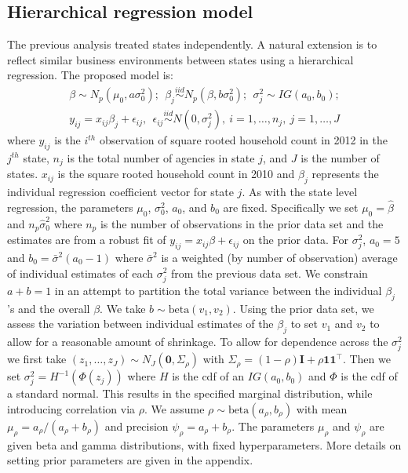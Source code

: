 \documentclass[ba]{imsart}
\newcommand{\mb}{\mathbf}
\newcommand{\iid}{\stackrel{iid}{\sim}}
\begin{document}
\subsection{Hierarchical regression model}
\label{hierRegNW}
The previous analysis treated states independently. A natural extension is to  reflect similar business environments between states using a hierarchical regression. The proposed model is:
\begin{align}
\label{eq:hierModel}
&\beta\sim N_p(\mu_0, a\sigma_0^{2});\ \ 
\beta_j\iid N_p(\beta, b\sigma_0^{2}); \ \  
\sigma_j^2\sim IG(a_0,b_0);  & \\ \nonumber
& y_{ij}=x_{ij}\beta_j+\epsilon_{ij},\ \ \epsilon_{ij}\iid N(0, \sigma_j^2),\ i=1,\dots, n_j,\ j=1,\dots, J &
\end{align}
where $y_{ij}$ is the $i^{th}$ observation of square rooted household count in 2012 in the $j^{th}$
state, $n_{j}$ is the total number of agencies in state $j$, and $J$ is
the number of states. $x_{ij}$ is the square rooted household count in 2010 and $\beta_j$ represents the individual regression coefficient vector for state $j$. As with the state level regression, the parameters $\mu_0$,
$\sigma^{2}_0$, $a_0$, and $b_0$ are fixed. Specifically we set $\mu_{0} = \hat\beta$ and $n_{p}\hat\sigma^{2}_{0}$ where $n_{p}$ is the number of observations in the prior data set and the estimates are from a robust fit of $y_{ij}=x_{ij}\beta+\epsilon_{ij}$ on the prior data. For $\sigma^{2}_{j}$, $a_{0}=5$ and $b_{0} = \bar\sigma^{2}(a_{0} -1)$ where $\bar\sigma^{2}$ is a weighted (by number of observation) average of individual estimates of each $\sigma_{j}^{2}$ from the previous data set. We constrain $a+b=1$
in an attempt to partition the total variance between the individual
$\beta_j$'s and the overall $\beta$. We take $b\sim
\text{beta}(v_1,v_2)$. Using the prior data set, we assess the
variation between individual estimates of the $\beta_j$ to set $v_1$
and $v_2$ to allow for a reasonable amount of shrinkage. To allow for
dependence across the $\sigma_j^2$ we first take
$(z_1,\dots,z_J)\sim N_J(\mathbf{0}, \Sigma_\rho)$ with
$\Sigma_\rho=(1-\rho)\mb{I}+\rho \mb{1}\mb{1}^{\top}$. Then we set
$\sigma^2_j=H^{-1}(\Phi(z_j))$ where $H$ is the cdf of an
$IG(a_0,b_0)$ and $\Phi$ is the cdf of a standard normal. This results in the specified marginal distribution, while
introducing correlation via $\rho$. We assume $\rho\sim
\text{beta}(a_\rho,b_\rho)$ with mean $\mu_\rho=a_\rho/(a_\rho+b_\rho)$ and precision
$\psi_\rho=a_\rho+b_\rho$. The parameters $\mu_\rho$ and
$\psi_{\rho}$  are given beta and gamma distributions, with fixed hyperparameters. More details on setting prior parameters are given in the appendix. 
\end{document}
